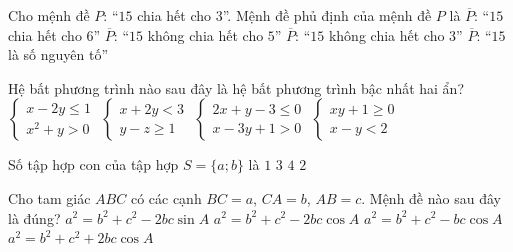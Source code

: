\caulc
\begin{ex}
	Cho mệnh đề $P$: ``$15$ chia hết cho $3$''. Mệnh đề phủ định của mệnh đề $P$ là
	\choice
{$\overline{P}$: ``$15$ chia hết cho $6$''}
{$\overline{P}$: ``$15$ không chia hết cho $5$''}
{\True $\overline{P}$: ``$15$ không chia hết cho $3$''}
{$\overline{P}$: ``$15$ là số nguyên tố''}
\end{ex}

\begin{ex}
	Hệ bất phương trình nào sau đây là hệ bất phương trình bậc nhất hai ẩn?
	\choice
{$\begin{cases} x - 2y \le 1 \\ x^2 + y > 0 \end{cases}$}
{$\begin{cases} x + 2y < 3 \\ y - z \ge 1 \end{cases}$}
{\True $\begin{cases} 2x + y - 3 \le 0 \\ x - 3y + 1 > 0 \end{cases}$}
{$\begin{cases} xy + 1 \ge 0 \\ x - y < 2 \end{cases}$}
\end{ex}

\begin{ex}
	Số tập hợp con của tập hợp $S = \{a; b\}$ là
	\choice
{$1$}
{$3$}
{\True $4$}
{$2$}
\end{ex}

\begin{ex}
	Cho tam giác $ABC$ có các cạnh $BC = a$, $CA = b$, $AB = c$. Mệnh đề nào sau đây là đúng?
	\choice
{$a^2 = b^2 + c^2 - 2bc \sin A$}
{\True $a^2 = b^2 + c^2 - 2bc \cos A$}
{$a^2 = b^2 + c^2 - bc \cos A$}
{$a^2 = b^2 + c^2 + 2bc \cos A$}
\end{ex}

